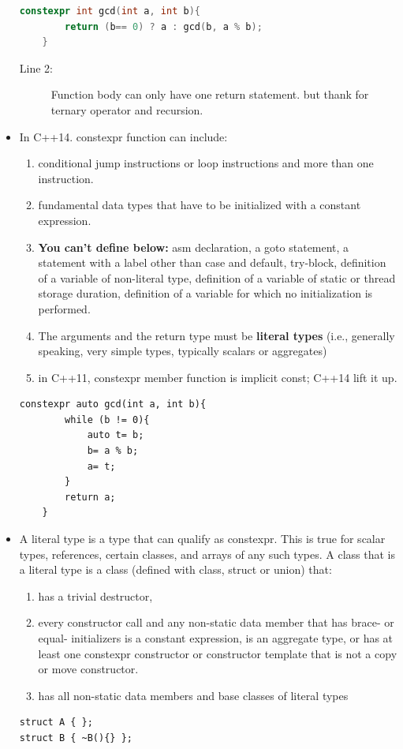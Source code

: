 \documentclass[a4paper,11pt,twoside]{book}
\begin{document}
\begin{itemize}
\begin{lstlisting}[frame=single, language=c++]
	constexpr int gcd(int a, int b){
		return (b== 0) ? a : gcd(b, a % b);
	}
\end{lstlisting}
	\begin{description}
		\item[Line 2:] Function body can only have one return statement. but thank for ternary operator and recursion.
	\end{description}
	
	\item In C++14. constexpr function can include: 
	\begin{enumerate}
		\item conditional jump instructions or loop instructions and more than one instruction.
		
		\item fundamental data types that have to be initialized with a constant expression.
		
		\item \textbf{You can't define below:} asm declaration, a goto statement, a statement with a label other than case and default, try-block, definition of a variable of non-literal type, definition of a variable of static or thread storage duration, definition of a variable for which no initialization is performed.
		
		\item The arguments and the return type must be \textbf{literal types} (i.e., generally speaking, very simple types, typically scalars or aggregates)
		
		\item in C++11, constexpr member function is implicit const; C++14 lift it up.
	\end{enumerate}
\begin{lstlisting}[numbers=none]
	constexpr auto gcd(int a, int b){
		while (b != 0){
			auto t= b;
			b= a % b;
			a= t;
		}
		return a;
	}
\end{lstlisting}
    \item A literal type is a type that can qualify as constexpr. This is true for scalar types, references, certain classes, and arrays of any such types. A class that is a literal type is a class (defined with class, struct or union) that:
        \begin{enumerate}
            \item has a trivial destructor,
            \item every constructor call and any non-static data member that has brace- or equal- initializers is a constant expression, is an aggregate type, or has at least one constexpr constructor or constructor template that is not a copy or move constructor.
            \item has all non-static data members and base classes of literal types 
        \end{enumerate}
\begin{lstlisting}[]
struct A { };
struct B { ~B(){} };


\end{lstlisting}
\end{itemize}
\end{document}

